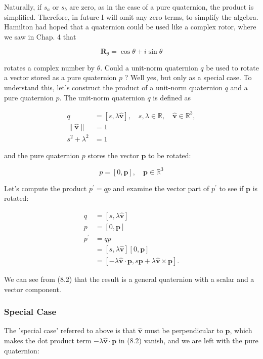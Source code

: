 \documentclass[10pt]{article}
\begin{document}
Naturally, if $s_{a}$ or $s_{b}$ are zero, as in the case of a pure quaternion, the product is simplified. Therefore, in future I will omit any zero terms, to simplify the algebra. Hamilton had hoped that a quaternion could be used like a complex rotor, where we saw in Chap. 4 that

$$
\mathbf{R}_{\theta}=\cos \theta+i \sin \theta
$$

rotates a complex number by $\theta$. Could a unit-norm quaternion $q$ be used to rotate a vector stored as a pure quaternion $p$ ? Well yes, but only as a special case. To understand this, let's construct the product of a unit-norm quaternion $q$ and a pure quaternion $p$. The unit-norm quaternion $q$ is defined as

$$
\begin{aligned}
q & =[s, \lambda \hat{\mathbf{v}}], \quad s, \lambda \in \mathbb{R}, \quad \hat{\mathbf{v}} \in \mathbb{R}^{3}, \\
\|\hat{\mathbf{v}}\| & =1 \\
s^{2}+\lambda^{2} & =1
\end{aligned}
$$

and the pure quaternion $p$ stores the vector $\mathbf{p}$ to be rotated:

$$
p=[0, \mathbf{p}], \quad \mathbf{p} \in \mathbb{R}^{3}
$$

Let's compute the product $p^{\prime}=q p$ and examine the vector part of $p^{\prime}$ to see if $\mathbf{p}$ is rotated:

$$
\begin{aligned}
q & =[s, \lambda \hat{\mathbf{v}}] \\
p & =[0, \mathbf{p}] \\
p^{\prime} & =q p \\
& =[s, \lambda \hat{\mathbf{v}}][0, \mathbf{p}] \\
& =[-\lambda \hat{\mathbf{v}} \cdot \mathbf{p}, s \mathbf{p}+\lambda \hat{\mathbf{v}} \times \mathbf{p}] .
\end{aligned}
$$

We can see from (8.2) that the result is a general quaternion with a scalar and a vector component.

\subsubsection{Special Case}
The 'special case' referred to above is that $\hat{\mathbf{v}}$ must be perpendicular to $\mathbf{p}$, which makes the dot product term $-\lambda \hat{\mathbf{v}} \cdot \mathbf{p}$ in (8.2) vanish, and we are left with the pure quaternion:
\end{document}
